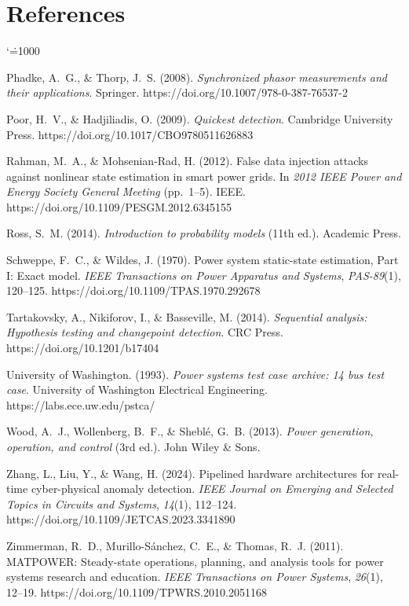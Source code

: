 \documentclass[11pt,a4paper]{report}
\makeatletter
\renewcommand{\bibname}{References}
\renewenvironment{thebibliography}[1]{%
  \chapter*{\bibname}%
  \addcontentsline{toc}{chapter}{\bibname}%
  \list{}{%
    \setlength{\labelwidth}{0pt}%
    \setlength{\labelsep}{0pt}%
    \setlength{\leftmargin}{0.35in}%
    \setlength{\itemindent}{-0.35in}%
    \setlength{\itemsep}{6pt}%
    \setlength{\parsep}{0pt}%
    \usecounter{enumiv}%
    \let\p@enumiv\@empty
    \renewcommand\theenumiv{\@arabic\c@enumiv}%
  }%
  \sloppy\clubpenalty4000\widowpenalty4000%
  \sfcode`\.=1000\relax
}{%
  \endlist
}
\makeatother
\begin{document}
\begin{thebibliography}{99}
Phadke, A.~G., \& Thorp, J.~S. (2008). \textit{Synchronized phasor measurements and their applications}. Springer. https://doi.org/10.1007/978-0-387-76537-2

Poor, H.~V., \& Hadjiliadis, O. (2009). \textit{Quickest detection}. Cambridge University Press. https://doi.org/10.1017/CBO9780511626883

Rahman, M.~A., \& Mohsenian-Rad, H. (2012). False data injection attacks against nonlinear state estimation in smart power grids. In \textit{2012 IEEE Power and Energy Society General Meeting} (pp.~1--5). IEEE. https://doi.org/10.1109/PESGM.2012.6345155

Ross, S.~M. (2014). \textit{Introduction to probability models} (11th ed.). Academic Press.

Schweppe, F.~C., \& Wildes, J. (1970). Power system static-state estimation, Part I: Exact model. \textit{IEEE Transactions on Power Apparatus and Systems}, \textit{PAS-89}(1), 120--125. https://doi.org/10.1109/TPAS.1970.292678

Tartakovsky, A., Nikiforov, I., \& Basseville, M. (2014). \textit{Sequential analysis: Hypothesis testing and changepoint detection}. CRC Press. https://doi.org/10.1201/b17404

University of Washington. (1993). \textit{Power systems test case archive: 14 bus test case}. University of Washington Electrical Engineering. https://labs.ece.uw.edu/pstca/

Wood, A.~J., Wollenberg, B.~F., \& Shebl{\'e}, G.~B. (2013). \textit{Power generation, operation, and control} (3rd ed.). John Wiley \& Sons.

Zhang, L., Liu, Y., \& Wang, H. (2024). Pipelined hardware architectures for real-time cyber-physical anomaly detection. \textit{IEEE Journal on Emerging and Selected Topics in Circuits and Systems}, \textit{14}(1), 112--124. https://doi.org/10.1109/JETCAS.2023.3341890

Zimmerman, R.~D., Murillo-S{\'a}nchez, C.~E., \& Thomas, R.~J. (2011). MATPOWER: Steady-state operations, planning, and analysis tools for power systems research and education. \textit{IEEE Transactions on Power Systems}, \textit{26}(1), 12--19. https://doi.org/10.1109/TPWRS.2010.2051168

\end{thebibliography}
\end{document}
